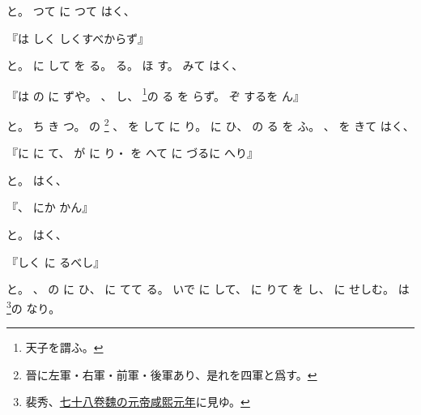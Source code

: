 \documentclass[a4paper,12pt]{article}
\begin{document}
と。%
つて%
に%
つて%
はく、%
\begin{quoting}
『は%
しく%
しくすべからず』
\end{quoting}
と。%
に%
して%
を%
る。%
%
%
る。%
%
ほ%
す。%
%
みて%
はく、%
\begin{quoting}
『は%
の%
に%
ずや。%
、%
%
し、%
\footnote{天子を謂ふ。}の%
る%
を%
らず。%
ぞ%
するを%
ん』
\end{quoting}
と。%
%
ち%
き%
つ。%
の%
%
\footnote{晉に左軍・右軍・前軍・後軍あり、是れを四軍と爲す。}%
、%
を%
して%
に%
り。%
%
に%
ひ、%
の%
る%
を%
ふ。%
、%
を%
きて%
はく、%
\begin{quoting}
『に%
に%
て、%
が%
に%
り・%
を%
へて%
に%
づるに%
へり』
\end{quoting}
と。%
%
はく、%
\begin{quoting}
『、%
にか%
かん』
\end{quoting}
と。%
%
はく、%
\begin{quoting}
『しく%
に%
るべし』
\end{quoting}
と。%
、%
の%
に%
ひ、%
に%
%
てて%
る。%
いで%
に%
して、%
に%
りて%
を%
し、%
に%
せしむ。%
は%
\footnote{裴秀、\href{http://dl.ndl.go.jp/info:ndljp/pid/1239900/97}{七十八卷魏の元帝咸熙元年}に見ゆ。}の%
なり。%
\end{document}
